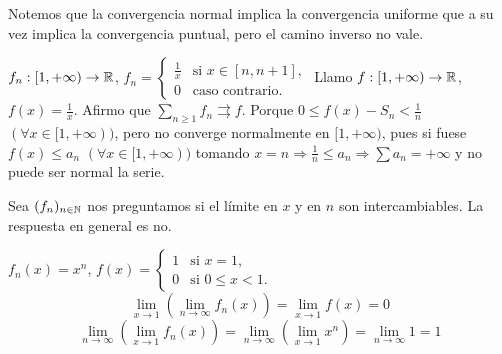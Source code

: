 Notemos que la convergencia normal implica la convergencia uniforme que a su vez implica la convergencia puntual, pero el camino inverso no vale.

\begin{eg}
  $f_n: [1, +\infty) \to \mathbb{R}$, $f_n = \begin{cases}
    \frac{1}{x} & \text{si } x \in [n, n+1], \\
    0 & \text{caso contrario.}
  \end{cases}$
  Llamo $f: [1, +\infty) \to \mathbb{R}$, $f(x) = \frac{1}{x}$. Afirmo que $\sum_{n \geq 1} f_n \rightrightarrows f$. Porque $0 \leq f(x) - S_n < \frac{1}{n}$ $(\forall x \in [1, +\infty))$, pero no converge normalmente en $[1, +\infty)$, pues si fuese $f(x) \leq a_n$ $(\forall x \in [1, +\infty))$ tomando $x = n \Rightarrow \frac{1}{n} \leq a_n \Rightarrow \sum a_n = +\infty$ y no puede ser normal la serie.
\end{eg}

\begin{note}
  Sea $(f_n)_{n \in \mathbb{N}}$ nos preguntamos si el límite en $x$ y en $n$ son intercambiables. La respuesta en general es no.
\end{note}

\begin{eg}
  $f_n(x) = x^n$, $f(x) = \begin{cases}
    1 & \text{si } x = 1, \\
    0 & \text{si } 0 \leq x < 1. 
  \end{cases}$ \begin{equation}
    \lim_{x \to 1} (\lim_{n \to \infty} f_n(x)) = \lim_{x \to 1} f(x) = 0
  \end{equation}
  \begin{equation}
    \lim_{n \to \infty} (\lim_{x \to 1} f_n(x)) = \lim_{n \to \infty} (\lim_{x \to 1} x^n) = \lim_{n \to \infty} 1 = 1
  \end{equation}
\end{eg}

